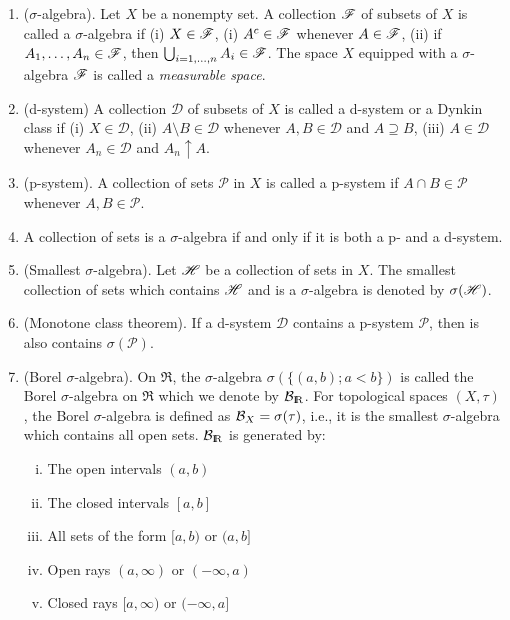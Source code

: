 \documentclass[a4paper,10pt]{article}
\begin{document}
\begin{enumerate}
 \item ($\sigma$-algebra). Let $X$ be a nonempty set. A collection $\mathscr{F}$ of subsets of $X$
       is called a $\sigma$-algebra if (i) $X \in \mathscr{F}$, (i) $A^c\in\mathscr{F}$ whenever $A\in\mathscr{F}$,
       (ii) if $A_1,\ldots, A_n\in\mathscr{F}$, then $\bigcup_{i=1,\ldots,n}A_i\in\mathscr{F}$. The space $X$
       equipped with a $\sigma$-algebra $\mathscr{F}$ is called a \textit{measurable space}.
       
 \item (d-system) A collection $\mathcal{D}$ of subsets of $X$ is called a d-system or a Dynkin class if 
       (i) $X\in\mathcal{D}$,
       (ii) $A\setminus B\in\mathcal{D}$ whenever $A,B\in\mathcal{D}$ and $A\supseteq B$,
       (iii) $A\in\mathcal{D}$ whenever $A_n\in \mathcal{D}$ and $A_n \uparrow A$.
       
 \item (p-system). A collection of sets $\mathcal{P}$ in $X$ is called a p-system
       if $A\cap B\in \mathcal{P}$ whenever $A,B\in\mathcal{P}$.
       
 \item A collection of sets is a $\sigma$-algebra if and only if it is both a p- and a d-system.
 
 \item (Smallest $\sigma$-algebra). Let $\mathscr{H}$ be a collection of sets in $X$. The smallest collection of sets
       which contains $\mathscr{H}$ and is a $\sigma$-algebra is denoted by $\sigma(\mathscr{H})$.
 
 \item (Monotone class theorem). If a d-system $\mathcal{D}$ contains a p-system $\mathcal{P}$, then is also contains $\sigma(\mathcal{P})$.
 
 \item \label{mps1311949}
       (Borel $\sigma$-algebra). On $\Re$, the $\sigma$-algebra $\sigma(\{(a,b); a<b\})$ is called the Borel $\sigma$-algebra on $\Re$
       which we denote by $\B_\Re$. For topological spaces $(X,\tau)$, the Borel $\sigma$-algebra is
       defined as $\mathcal{B}_X = \sigma(\tau)$, i.e., it is the smallest $\sigma$-algebra which contains
       all open sets. $\B_\Re$ is generated by:
       \begin{enumerate}[(i)]
        \item The open intervals $(a,b)$
        \item The closed intervals $[a,b]$
        \item All sets of the form $[a,b)$ or $(a,b]$
        \item Open rays $(a,\infty)$ or $(-\infty,a)$
        \item Closed rays $[a,\infty)$ or $(-\infty,a]$
       \end{enumerate}            


\end{enumerate}
\end{document}
